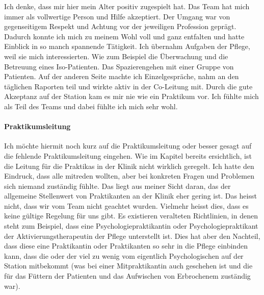 Ich denke, dass mir hier mein Alter positiv zugespielt hat. Das Team hat mich immer als vollwertige Person und Hilfe akzeptiert. Der Umgang war von gegenseitigem Respekt und Achtung vor der jeweiligen Profession geprägt. Dadurch konnte ich mich zu meinem Wohl voll und ganz entfalten und hatte Einblick in so manch spannende Tätigkeit. Ich übernahm Aufgaben der Pflege, weil sie mich interessierten. Wie zum Beispiel die Überwachung und die Betreuung eines Iso-Patienten. Das Spazierengehen mit einer Gruppe von Patienten. Auf der anderen Seite machte ich Einzelgespräche, nahm an den täglichen Raporten teil und wirkte aktiv in der Co-Leitung mit. Durch die gute Akzeptanz auf der Station kam es mir nie wie ein Praktikum vor. Ich fühlte mich als Teil des Teams und dabei fühlte ich mich sehr wohl.  

\paragraph{Praktikumsleitung}
Ich möchte hiermit noch kurz auf die Praktikumsleitung oder besser gesagt auf die fehlende Praktikumsleitung eingehen. Wie im Kapitel  bereits ersichtlich, ist die Leitung für die Praktikas in der Klinik nicht wirklich geregelt. Ich hatte den Eindruck, dass alle mitreden wollten, aber bei konkreten Fragen und Problemen sich niemand zuständig fühlte. Das liegt aus meiner Sicht daran, das der allgemeine Stellenwert von Praktikanten an der Klinik eher gering ist. Das heisst nicht, dass wir vom Team nicht geachtet wurden. Vielmehr heisst dies, dass es keine gültige Regelung für uns gibt. Es existieren veralteten Richtlinien, in denen steht zum Beispiel, dass eine Psychologiepraktikantin oder Psychologiepraktikant der Aktivierungstherapeutin der Pflege unterstellt ist. Dies hat aber den Nachteil, dass diese eine Praktikantin oder Praktikanten so sehr in die Pflege einbinden kann, dass die oder der viel zu wenig vom eigentlich Psychologischen auf der Station mitbekommt (was bei einer Mitpraktikantin auch geschehen ist und die für das Füttern der Patienten und das Aufwischen von Erbrochenem zuständig war). 


